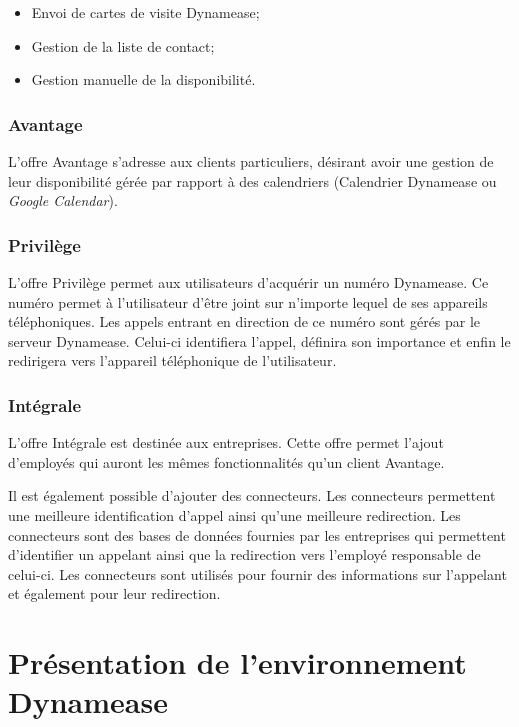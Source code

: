 \begin{itemize}
	\item Envoi de cartes de visite Dynamease;
	\item Gestion de la liste de contact;
	\item Gestion manuelle de la disponibilité.
\end{itemize}

\subsubsection{Avantage}

L'offre Avantage s'adresse aux clients particuliers, désirant avoir une gestion de leur disponibilité gérée par rapport à des calendriers (Calendrier Dynamease ou \textit{Google Calendar}).

\subsubsection{Privilège}

L'offre Privilège permet aux utilisateurs d'acquérir un numéro Dynamease. Ce numéro permet à l'utilisateur d'être joint sur n'importe lequel de ses appareils téléphoniques. Les appels entrant en direction de ce numéro sont gérés par le serveur Dynamease. Celui-ci identifiera l'appel, définira son importance et enfin le redirigera vers l'appareil téléphonique de l'utilisateur.

\subsubsection{Intégrale}

L'offre Intégrale est destinée aux entreprises. Cette offre permet l'ajout d'employés qui auront les mêmes fonctionnalités qu'un client  Avantage.

Il est également possible d'ajouter des connecteurs. Les connecteurs permettent une meilleure identification d'appel ainsi qu'une meilleure redirection. Les connecteurs sont des bases de données fournies par les entreprises qui permettent d'identifier un appelant ainsi que la redirection vers l'employé responsable de celui-ci. Les connecteurs sont utilisés pour fournir des informations sur l'appelant et également pour leur redirection.

\section{Présentation de l'environnement Dynamease}

